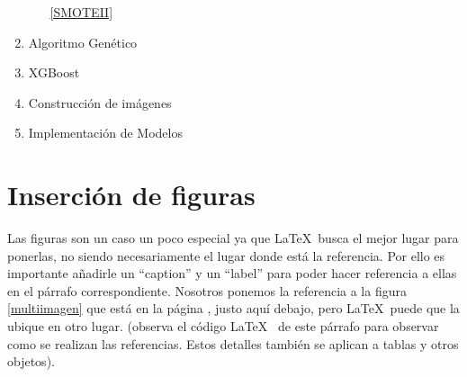 \begin{enumerate}
\begin{enumerate}
                    \ref{SMOTEII}

            \end{enumerate}

        \item Algoritmo Genético
            \cite{GAXGBoost}

        \item XGBoost

        \item Construcción de imágenes

            \cite{TASPCNN}

        \item Implementación de Modelos

            \cite{AutoSklearn}

    \end{enumerate}

\newpage
\section{Inserción de figuras}


Las figuras son un caso un poco especial ya que \LaTeX~busca el mejor lugar para ponerlas, no siendo necesariamente el lugar donde está la referencia. Por ello es importante añadirle un ``caption'' y un ``label'' para poder hacer referencia a ellas en el párrafo correspondiente. Nosotros ponemos la referencia a la figura \ref{multiimagen} que está en la página \pageref{multiimagen}, justo aquí debajo, pero \LaTeX ~puede que la ubique en otro lugar. (observa el código \LaTeX~ de este párrafo para observar como se realizan las referencias. Estos detalles también se aplican a tablas y otros objetos).



